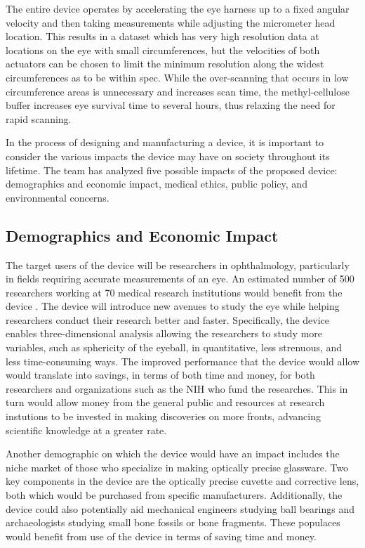 \documentclass{article}
\begin{document}
The entire device operates by accelerating the eye harness up to a fixed angular velocity and then taking measurements while adjusting the micrometer head location. This results in a dataset which has very high resolution data at locations on the eye with small circumferences, but the velocities of both actuators can be chosen to limit the minimum resolution along the widest circumferences as to be within spec. While the over-scanning that occurs in low circumference areas is unnecessary and increases scan time, the methyl-cellulose buffer increases eye survival time to several hours, thus relaxing the need for rapid scanning.
 
In the process of designing and manufacturing a device, it is important to consider the various impacts the device may have on society throughout its lifetime. The team has analyzed five possible impacts of the proposed device: demographics and economic impact, medical ethics, public policy, and environmental concerns. 
 
 
\subsection{Demographics and Economic Impact}
\label{sec:Demographics}
 
The target users of the device will be researchers in ophthalmology, particularly in
fields requiring accurate measurements of an eye. An estimated number
of 500 researchers working at 70 medical research institutions would
benefit from the device \cite{nickerson}. The device will introduce new avenues to
study the eye while helping researchers conduct their research better
and faster. Specifically, the device enables three-dimensional
analysis allowing the researchers to study more variables, such as
sphericity of the eyeball, in quantitative, less strenuous, and less
time-consuming ways. The improved performance that the device would
allow would translate into savings, in terms of both time and money,
for both researchers and organizations such as the NIH who fund the
researches. This in turn would allow money from the general public and
resources at research instutions to be invested in making discoveries
on more fronts, advancing scientific knowledge at a greater
rate. 
 
Another demographic on which the device would have an impact includes
the niche market of those who specialize in making optically precise
glassware. Two key components in the device are the optically precise
cuvette and corrective lens, both which would be purchased from
specific manufacturers. Additionally, the device could also
potentially aid mechanical engineers studying ball bearings and
archaeologists studying small bone fossils or bone fragments. These
populaces would  benefit from use of the device in terms of saving time and money. 
\end{document}
